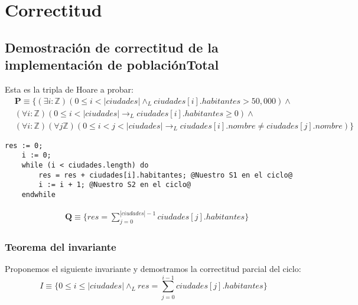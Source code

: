 \documentclass[10pt,a4paper]{article}
\begin{document}
\newpage



\section{Correctitud}
\subsection{Demostración de correctitud de la implementación de \textsf{poblaciónTotal}}

Esta es la tripla de Hoare a probar:
\begin{equation*}
    \begin{split}
        &\textbf{P} \equiv \{(\exists i:\mathbb{Z})(0 \leq i < |ciudades| \land_L ciudades[i].habitantes > 50,000) \land \\
        &(\forall i : \mathbb{Z})(0 \leq i < |ciudades| \longrightarrow_L ciudades[i].habitantes \geq 0) \land\\
        &(\forall i :\mathbb{Z})(\forall j \mathbb{Z})(0 \leq i < j < |ciudades| \longrightarrow_L ciudades[i].nombre \ne ciudades[j].nombre)\}
    \end{split}
\end{equation*}
\begin{lstlisting}[style=base]
    res := 0;
    i := 0;
    while (i < ciudades.length) do 
        res = res + ciudades[i].habitantes; @Nuestro S1 en el ciclo@
        i := i + 1; @Nuestro S2 en el ciclo@
    endwhile
\end{lstlisting}
\begin{equation*}
    \begin{split}
        &\textbf{Q}\equiv \{res = \sum_{j = 0}^{|ciudades| - 1} ciudades[j].habitantes\}
    \end{split}
\end{equation*}


\subsubsection{Teorema del invariante}
Proponemos el siguiente invariante y demostramos la correctitud parcial del ciclo: 
\begin{equation*}
    I \equiv \{0 \leq i \leq |ciudades| \land_L res = \sum\limits_{j = 0}^{i - 1} ciudades[j].habitantes\}
\end{equation*}
\end{document}
